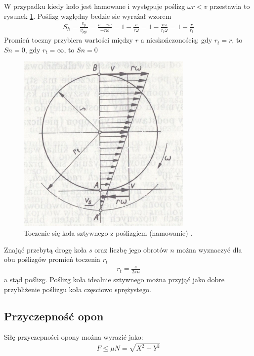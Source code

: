 \documentclass{article}
\begin{document}
	
	W przypadku kiedy koło jest hamowane i występuje poślizg $\omega r < v$ przestawia to rysunek \ref{fig:toczenie_kol_sztywengo_z_poslizgiem_hamowanie}.
	Poślizg względny bedzie sie wyrażał wzorem
	\begin{align}
		S_h=\frac{v_p}{v_{pgr}}=\frac{v-r\omega}{-r\omega}=1-\frac{v}{r\omega}=1-\frac{r\omega}{r_t\omega}=1-\frac{r}{r_t}
	\end{align}
		Promień toczny przybiera wartości między $r$ a nieskończonością; gdy $r_t=r$, to $Sn=0$, gdy $r_t=\infty$, to $Sn=0$
	\begin{figure}[h!]
		\centering
		\includegraphics[scale=1.5]{toczenie_kola_sztywnego_z_poslizgiem_hamowanie.jpg}
		\caption{Toczenie się koła sztywnego z poślizgiem (hamowanie)  \cite{Arczynski}.}
		\label{fig:toczenie_kol_sztywengo_z_poslizgiem_hamowanie}
	\end{figure}
	
	Znająć przebytą drogę koła $s$ oraz liczbę jego obrotów $n$ można wyznaczyć dla obu poślizgów promień toczenia $r_t$
	\begin{align}
		r_t=\frac{s}{2\pi n} 
	\end{align}
	a stąd poślizg.
	Poślizg koła idealnie sztywnego można przyjąć jako dobre przybliżenie poślizgu koła częsciowo sprężystego.
	\subsection{Przyczepność opon}
	
	Siłę przyczepności opony można wyrazić jako:
	\begin{align}
		F \leq \mu N = \sqrt{X^2 + Y^2}
	\end{align}
	
\end{document}
